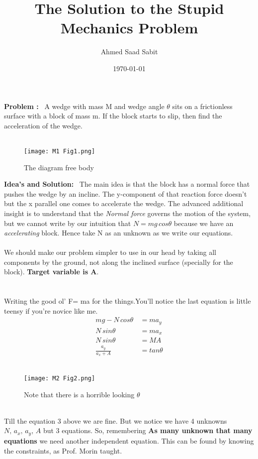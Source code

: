 \documentclass[10pt]{article}
\title{The Solution to the Stupid Mechanics Problem}
\author{Ahmed Saad Sabit}
\date{\today}
\begin{document}
\maketitle

\textbf{\textsf{Problem :}} \, A wedge with mass M and wedge angle $\theta$ sits on a frictionless surface with a block of mass m. If the block starts to slip, then find the acceleration of the wedge.\\
\\
\begin{figure}[hbtp]
\centering
\texttt{[image: M1 Fig1.png]}
\caption{The diagram free body}
\end{figure}
\textbf{\textsf{Idea's and Solution:}} \, The main idea is that the block has a normal force that pushes the wedge by an incline. The y-component of that reaction force doesn't but the x parallel one comes to accelerate the wedge. The advanced additional insight is to understand that the \emph{Normal force} governs the motion of the system, but we cannot write by our intuition that $N=mg\,cos\theta$ because we have an \emph{accelerating} block. Hence take N as an unknown as we write our equations. \\
\\
We should make our problem simpler to use in our head by taking all components by the ground, not along the inclined surface (specially for the block). \textbf{Target variable is A}.
\\ 
\\
\\
Writing the good ol' F= ma for the things.You'll notice the last equation is little teensy if you're novice like me.
\begin{align}
mg - N\,cos\theta \,&= ma_y \\
N\,sin\theta &= ma_x \\
N\, sin\theta &= MA \\
\frac{a_y}{ a_x + A} &= tan\theta 
\end{align}
\\
\begin{figure}[hbtp]
\centering
\texttt{[image: M2 Fig2.png]}
\caption{Note that there is a horrible looking $\theta$}
\end{figure}
\\
Till the equation 3 above we are fine. But we notice we have 4 unknowns $N,\,a_x,\,a_y,\,A$ but 3 equations. So, remembering \textbf{As many unknown that many equations} we need another independent equation. This can be found by knowing the constraints, as Prof. Morin taught.\\
\end{document}
